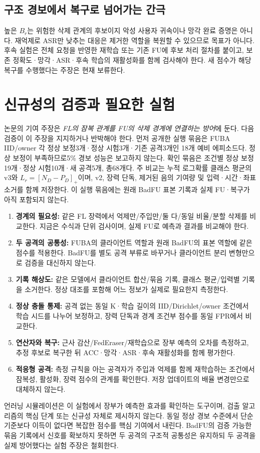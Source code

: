 \documentclass[10pt,a4paper]{article}
\begin{document}
\subsection{구조 경보에서 복구로 넘어가는 간극}
높은 $B_r$는 위험한 삭제 관계의 후보이지 악성 사용자 귀속이나 망각 완료 증명은 아니다.
재억제로 ASR만 낮추는 대응은 제거한 역할을 복원할 수 있으므로 목표가 아니다.
후속 실험은 전체 요청을 반영한 재학습 또는 기존 FU에 후보 처리 절차를 붙이고,
보존 정확도·망각·ASR·후속 학습의 재활성화를 함께 검사해야 한다.
새 점수가 해당 복구를 수행했다는 주장은 현재 보류한다.

\section{신규성의 검증과 필요한 실험}
논문의 기여 주장은 \emph{FL의 잠복 관계를 FU의 삭제 경계에 연결하는 방어}에 둔다.
다음 검증이 이 주장을 지지하거나 반박해야 한다.
먼저 공개한 실행 묶음은 FUBA IID/owner 각 정상 보정3개·정상 시험3개·기존 공격3개인
18개 예비 에피소드다. 정상 보정이 부족하므로5\% 경보 성능은 보고하지 않는다.
확인 묶음은 조건별 정상 보정19개·정상 시험10개·새 공격5개, 총68개다.
주 비교는 누적 로그확률 클래스 평균의 v3와 $L_r=[N_D-P_D]_+$이며,
v2, 장력 단독, 제거된 음의 기여량 및 입력·시간·좌표 소거를 함께 저장한다.
이 실행 묶음에는 원래 BadFU 표본 기록과 실제 FU·복구가 아직 포함되지 않는다.
\begin{enumerate}
\item \textbf{경계의 필요성:} 같은 FL 장력에서 억제만/주입만/둘 다/동일 비율/분할 삭제를 비교한다.
      지금은 수식과 단위 검사이며, 실제 FU로 예측과 결과를 비교해야 한다.
\item \textbf{두 공격의 공통성:} FUBA의 클라이언트 역할과 원래 BadFU의 표본 역할에 같은 점수를 적용한다.
      BadFU를 별도 공격 부류로 바꾸거나 클라이언트 분리 변형만으로 검증을 대신하지 않는다.
\item \textbf{기록 해상도:} 같은 모델에서 클라이언트 합산/묶음 기록, 클래스 평균/입력별 기록을 소거한다.
      정상 대조를 포함해 어느 정보가 실제로 필요한지 측정한다.
\item \textbf{정상 충돌 통제:} 공격 없는 동일 K·학습 길이의 IID/Dirichlet/owner 조건에서
      학습 시드를 나누어 보정하고, 장력 단독과 경계 조건부 점수를 동일 FPR에서 비교한다.
\item \textbf{연산자와 복구:} 근사 감산/FedEraser/재학습으로 장부 예측의 오차를 측정하고,
      추정 후보로 복구한 뒤 ACC·망각·ASR·후속 재활성화를 함께 평가한다.
\item \textbf{적응형 공격:} 측정 규칙을 아는 공격자가 주입과 억제를 함께 재학습하는 조건에서
      잠복성, 활성화, 장력 점수의 관계를 확인한다. 저장 업데이트의 배율 변경만으로 대체하지 않는다.
\end{enumerate}
언러닝 시뮬레이션은 이 실험에서 장부가 예측한 효과를 확인하는 도구이며,
검출 알고리즘의 핵심 단계 또는 신규성 자체로 제시하지 않는다.
동일 정상 경보 수준에서 단순 기준보다 이득이 없다면 복잡한 점수를 핵심 기여에서 내린다.
BadFU의 검증 가능한 묶음 기록에서 신호를 확보하지 못하면 두 공격의 구조적 공통성은 유지하되
두 공격을 실제 방어했다는 실험 주장은 철회한다.
\end{document}
